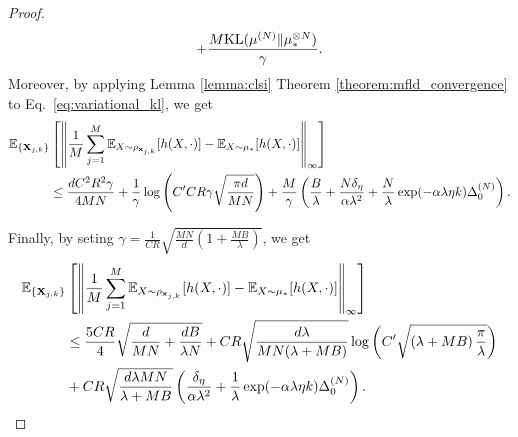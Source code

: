 \begin{proof}
\begin{equation*}
        + \frac{M\mathrm{KL}(\mu^{(N)}\|\mu^{\otimes N}_*)}{\gamma}.
    \end{equation*}
    Moreover, by applying Lemma \ref{lemma:clsi} Theorem \ref{theorem:mfld_convergence} to Eq.~\eqref{eq:variational_kl}, we get
    \begin{align*}
        \bE_{\{\vX_{j,k}\}}&\left[\left\| \frac{1}{M}\sum_{j=1}^M \bE_{X\sim \rho_{\vx_{j,k}}}[h(X,\cdot)] - \bE_{X\sim \mu_*} [h(X,\cdot)]\right\|_\infty\right] \\
        &\leq \frac{dC^2R^2\gamma}{4MN}
        + \frac{1}{\gamma}\log\left( C'CR\gamma\sqrt{\frac{\pi d}{MN}} \right)
        + \frac{M}{\gamma} \left(  \frac{B}{\lambda} + \frac{ N\delta_{\eta}}{\alpha\lambda^2} 
        + \frac{N}{\lambda}\exp( -\alpha\lambda\eta k )\pow[\Delta,N]_0 \right).
    \end{align*}

    Finally, by seting $\gamma = \frac{1}{CR}\sqrt{\frac{MN}{d}\left(1+\frac{MB}{\lambda}\right)}$, we get
    \begin{align*}
        \bE_{\{\vX_{j,k}\}}&\left[\left\| \frac{1}{M}\sum_{j=1}^M \bE_{X\sim \rho_{\vx_{j,k}}}[h(X,\cdot)] - \bE_{X\sim \mu_*} [h(X,\cdot)]\right\|_\infty\right] \\
        &\leq \frac{5CR}{4}\sqrt{\frac{d}{MN} + \frac{dB}{\lambda N}}
        + CR\sqrt{\frac{d\lambda}{MN(\lambda + MB)}}\log\left( C'\sqrt{\left(\lambda+MB\right)\frac{\pi}{\lambda}} \right) \\
        &+ CR\sqrt{\frac{d\lambda M N}{\lambda + MB}} \left(\frac{ \delta_{\eta}}{\alpha\lambda^2} 
        + \frac{1}{\lambda}\exp( -\alpha\lambda\eta k )\pow[\Delta,N]_0 \right).
    \end{align*}
\end{proof}



